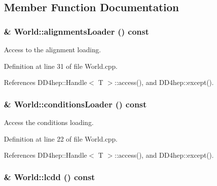\subsection{Member Function Documentation}
\hypertarget{class_d_d4hep_1_1_geometry_1_1_world_a85938d09aaaa0b9f9c2b35f691ed95af}{
\subsubsection[{alignmentsLoader}]{ \& World::alignmentsLoader () const}}
\label{class_d_d4hep_1_1_geometry_1_1_world_a85938d09aaaa0b9f9c2b35f691ed95af}


Access to the alignment loading. 

Definition at line 31 of file World.cpp.

References DD4hep::Handle$<$ T $>$::access(), and DD4hep::except().\hypertarget{class_d_d4hep_1_1_geometry_1_1_world_a3ebb7ff39c74dc435e717c91e02c6ac9}{
\subsubsection[{conditionsLoader}]{ \& World::conditionsLoader () const}}
\label{class_d_d4hep_1_1_geometry_1_1_world_a3ebb7ff39c74dc435e717c91e02c6ac9}


Access the conditions loading. 

Definition at line 22 of file World.cpp.

References DD4hep::Handle$<$ T $>$::access(), and DD4hep::except().\hypertarget{class_d_d4hep_1_1_geometry_1_1_world_a12698cbd31fbc6f7d3bdca85c7ff2976}{
\subsubsection[{lcdd}]{ \& World::lcdd () const}}
\label{class_d_d4hep_1_1_geometry_1_1_world_a12698cbd31fbc6f7d3bdca85c7ff2976}


